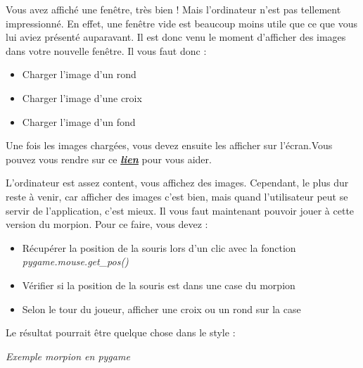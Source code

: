 \documentclass[a4paper]{article}
\begin{document}
\begin{flushleft}
\setlength{\parindent}{10ex}

\vspace*{1cm}
\setlength{\parindent}{3ex}Vous avez affiché une fenêtre, très bien ! Mais l’ordinateur n’est pas tellement impressionné. En effet, une fenêtre vide est beaucoup moins utile que ce que vous lui aviez présenté auparavant. Il est donc venu le moment d’afficher des images dans votre nouvelle fenêtre. Il vous faut donc :
\begin{itemize}[label=\textbullet,font=\color{black}] 
\item Charger l’image d’un rond

\item Charger l’image d’une croix

\item Charger l’image d’un fond 
\end{itemize}
Une fois les images chargées, vous devez ensuite les afficher sur l’écran.Vous pouvez vous rendre sur ce \href{https://zestedesavoir.com/tutoriels/846/pygame-pour-les-zesteurs/1381_a-la-decouverte-de-pygame/5505_afficher-des-images/}{\textbf{\textit{lien}}} pour vous aider.

\end{flushleft}

\begin{flushleft}

\vspace*{1cm}

\setlength{\parindent}{3ex}L’ordinateur est assez content, vous affichez des images. Cependant, le plus dur reste à venir, car afficher des images c’est bien, mais quand l’utilisateur peut se servir de l’application, c’est mieux. Il vous faut maintenant pouvoir jouer à cette version du morpion. Pour ce faire, vous devez :
\begin{itemize}[label=\textbullet,font=\color{black}] 
\item Récupérer la position de la souris lors d’un clic avec la fonction \textit{pygame.mouse.get\_pos()}

\item Vérifier si la position de la souris est dans une case du morpion

\item Selon le tour du joueur, afficher une croix ou un rond sur la case
\end{itemize}
Le résultat pourrait être quelque chose dans le style :
\end{flushleft}
\begin {center}
\textit{Exemple morpion en pygame}
\end {center}
\end{document}
